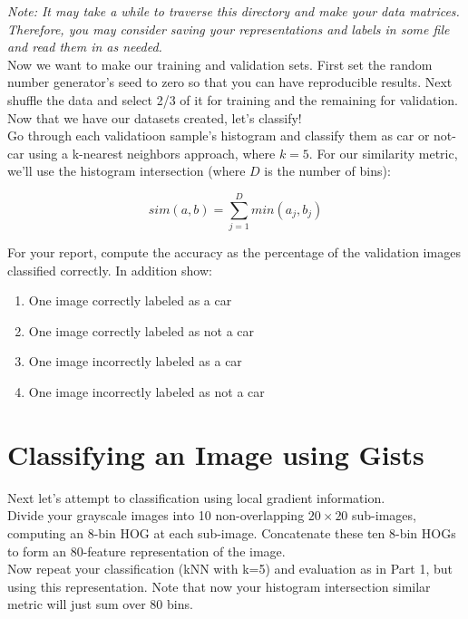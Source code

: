 \documentclass[12pt]{article}
\begin{document}
\noindent
\emph{Note:  It may take a while to traverse this directory and make your data matrices.  Therefore, you may consider saving your representations and labels in some file and read them in as needed.}\\

\noindent
Now we want to make our training and validation sets.  First set the random number generator’s seed to zero so that you can have reproducible results.  Next shuffle the data and select 2/3 of it for training and the remaining for validation.\\

\noindent
Now that we have our datasets created, let’s classify!\\

\noindent
Go through each validatioon sample's histogram and classify them as car or not-car using a k-nearest neighbors approach, where $k=5$.  For our similarity metric, we’ll use the histogram intersection (where $D$ is the number of bins):

$$sim(a,b)=\sum_{j=1}^{D} min(a_j,b_j )$$

\noindent
For your report, compute the accuracy as the percentage of the validation images classified correctly.  In addition show:

\begin{enumerate}
\item One image correctly labeled as a car
\item One image correctly labeled as not a car
\item One image incorrectly labeled as a car
\item One image incorrectly labeled as not a car
\end{enumerate}

\newpage

\section{Classifying an Image using Gists}
Next let’s attempt to classification using local gradient information.\\

\noindent
Divide your grayscale images into 10 non-overlapping $20\times 20$ sub-images, computing an 8-bin HOG at each sub-image.  Concatenate these ten 8-bin HOGs to form an 80-feature representation of the image.\\

\noindent
Now repeat your classification (kNN with k=5) and evaluation as in Part 1, but using this representation.  Note that now your histogram intersection similar metric will just sum over 80 bins.
\end{document}
